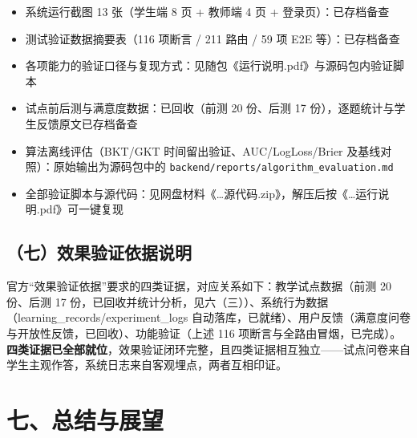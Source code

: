 \documentclass[zihao=-4,a4paper,UTF8,fontset=windows]{ctexart}
\begin{document}
\begin{itemize}[leftmargin=2em,itemsep=0pt,topsep=0pt]
\item 系统运行截图 13 张（学生端 8 页 + 教师端 4 页 + 登录页）：已存档备查
\end{itemize}
\begin{itemize}[leftmargin=2em,itemsep=0pt,topsep=0pt]
\item 测试验证数据摘要表（116 项断言 / 211 路由 / 59 项 E2E 等）：已存档备查
\end{itemize}
\begin{itemize}[leftmargin=2em,itemsep=0pt,topsep=0pt]
\item 各项能力的验证口径与复现方式：见随包《运行说明.pdf》与源码包内验证脚本
\end{itemize}
\begin{itemize}[leftmargin=2em,itemsep=0pt,topsep=0pt]
\item 试点前后测与满意度数据：已回收（前测 20 份、后测 17 份），逐题统计与学生反馈原文已存档备查
\end{itemize}
\begin{itemize}[leftmargin=2em,itemsep=0pt,topsep=0pt]
\item 算法离线评估（BKT/GKT 时间留出验证、AUC/LogLoss/Brier 及基线对照）：原始输出为源码包中的 \texttt{backend/reports/algorithm\_\allowbreak{}evaluation.\allowbreak{}md}
\end{itemize}
\begin{itemize}[leftmargin=2em,itemsep=0pt,topsep=0pt]
\item 全部验证脚本与源代码：见网盘材料《\dots{}源代码.zip》，解压后按《\dots{}运行说明.pdf》可一键复现
\end{itemize}
\subsection{（七）效果验证依据说明}


官方“效果验证依据”要求的四类证据，对应关系如下：教学试点数据（前测 20 份、后测 17 份，已回收并统计分析，见六（三））、系统行为数据（learning\_records/experiment\_logs 自动落库，已就绪）、用户反馈（满意度问卷与开放性反馈，已回收）、功能验证（上述 116 项断言与全路由冒烟，已完成）。\textbf{四类证据已全部就位}，效果验证闭环完整，且四类证据相互独立——试点问卷来自学生主观作答，系统日志来自客观埋点，两者互相印证。

\section{七、总结与展望}
\end{document}
